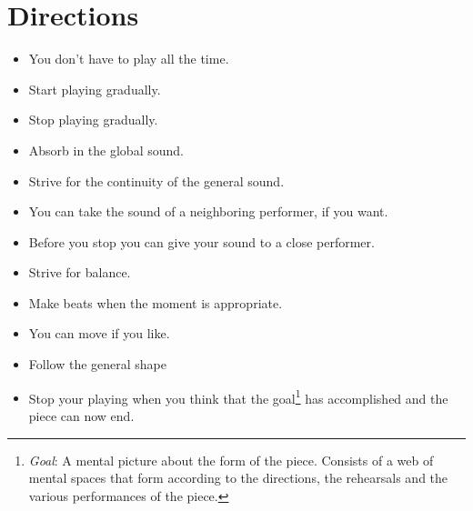 \documentclass[11pt,letterpage]{book}
\begin{document}
\section*{Directions}
\begin{itemize}
\item You don't have to play all the time.
\item Start playing gradually.
\item Stop playing gradually.
\item Absorb in the global sound.
\item Strive for the continuity of the general sound.
\item You can take the sound of a neighboring performer, if you want.
\item Before you stop you can give your sound to a close performer.
\item Strive for balance.
\item Make beats when the moment is appropriate.
\item You can move if you like.
\item Follow the general shape\\
  \begin{center}
  \end{center}
\item Stop your playing when you think that the goal\footnote{\textit{Goal}: A mental picture about the form of the piece. Consists of a web of mental spaces that form according to the directions, the rehearsals and the various performances of the piece.} has accomplished and the piece can now end.
\end{itemize}
\end{document}
